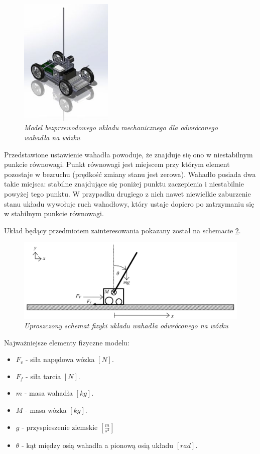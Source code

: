\documentclass[12pt, twoside, openany]{report}
\theoremstyle{definition}
\begin{document}
\begin{figure}[H]
	\centering
		\includegraphics[width = 125pt]{SystemModel} 
		\caption{\textit{Model bezprzewodowego układu mechanicznego dla odwróconego wahadła na wózku \cite{SystemModel}}}
		\label{SystemModelImage}
\end{figure}

Przedstawione ustawienie wahadła powoduje, że znajduje się ono w niestabilnym punkcie równowagi. Punkt równowagi jest miejscem przy którym element pozostaje w bezruchu (prędkość zmiany stanu jest zerowa). Wahadło posiada dwa takie miejsca: stabilne znajdujące się poniżej punktu zaczepienia i niestabilnie powyżej tego punktu. W przypadku drugiego z nich nawet niewielkie zaburzenie stanu układu wywołuje ruch wahadłowy, który ustaje dopiero po zatrzymaniu się w stabilnym punkcie równowagi. 


Układ będący przedmiotem zainteresowania pokazany został na schemacie \ref{SytemSchemeImage}.

\begin{figure}[H]
	\centering
		\includegraphics[width = 375pt]{SystemScheme} 
		\caption{\textit{Uproszczony schemat fizyki układu wahadła odwróconego na wózku \cite{LMIP} }}
		\label{SytemSchemeImage}
\end{figure}

Najważniejsze elementy fizyczne modelu:
\begin{itemize}
\item \(F_v\) - siła napędowa wózka \([N]\).
\item \(F_f\) - siła tarcia \([N]\).
\item \(m\) - masa wahadła \([kg]\). 
\item \(M\) - masa wózka \([kg]\).
\item \(g\) - przyspieszenie ziemskie \([\frac{m}{s^2}]\) 
\item \(\theta\) - kąt między osią wahadła a pionową osią układu \([rad]\).
\end{itemize}
\end{document}
